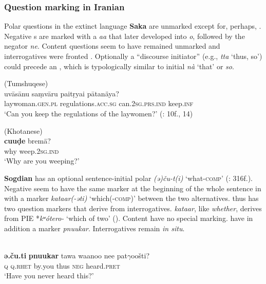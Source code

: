 \subsubsection{Question marking in Iranian}\label{sec:5.5.2.4}

Polar questions in the extinct  language \textbf{Saka} are unmarked except for, perhaps, . Negative s are marked with a  \textit{aa} that later developed into \textit{o}, followed by the negator \textit{ne}. Content questions seem to have remained unmarked and interrogatives were fronted \citep[402]{Emmerick2009}. Optionally a “discourse initiator” (e.g., \textit{tta} ‘thus, so’) could precede an  \citep[403]{Emmerick2009}, which is typologically similar to initial  \textit{nà}  ‘that’ or  \textit{so}.

\ea%
    \label{ex:indo:28}
     (Tumshuqese)\\
    \gll uv\=as\=anu    saṃv\=aru    paitṛyai    p\=atanäya?\\
    laywoman.\textsc{gen.pl}  regulations.\textsc{acc.sg}  can.2\textsc{sg.prs.ind}  keep.\textsc{inf}\\
    \glt ‘Can you keep the regulations of the laywomen?’ (\citealt{Emmerick1985}: 10f., 14)
    \z

\ea%
    \label{ex:indo:29}
     (Khotanese)\\
    \gll \textbf{{cuuḍe}} bremä?\\
    why  weep.2\textsc{sg.ind}\\
    \glt ‘Why are you weeping?’ \citep[402]{Emmerick2009}
    \z

\textbf{Sogdian} has an optional sentence-initial polar  \textit{(ə)ču-t(i)} ‘what-\textsc{comp}’ (\citealt{Yoshida2009}: 316f.). Negative  seem to have the same marker at the beginning of the whole sentence in  with a marker \textit{kataar(-əti)} ‘which(-\textsc{comp)}’ between the two alternatives.  thus has two question markers that derive from interrogatives.  \textit{kataar}, like  \textit{whether}, derives from PIE *\textit{kʷ}\textit{ótero-} ‘which of two’ (). Content  have no special marking.  have in addition a marker \textit{pnuukar}. Interrogatives remain \textit{in situ}.

\ea%
    \label{ex:indo:30}
    \\
    \ea
    \gll \textbf{{ə.ču.ti}} \textbf{{pnuukar}} tawa    waanoo  nee  pat$\gamma $oošti?\\
    \textsc{q}  \textsc{q.rhet}    by.you    thus    \textsc{neg}  heard.\textsc{pret}\\
    \glt ‘Have you never heard this?’
    
